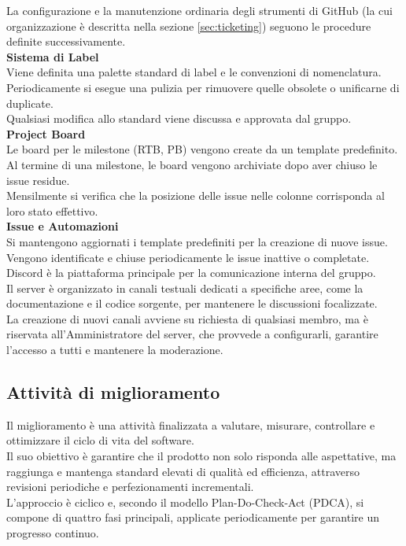 La configurazione e la manutenzione ordinaria degli strumenti di GitHub (la cui organizzazione è descritta nella sezione \ref{sec:ticketing}) seguono le procedure definite successivamente.\\[1em]
\textbf{Sistema di Label}\\
Viene definita una palette standard di label e le convenzioni di nomenclatura. Periodicamente si esegue una pulizia per rimuovere quelle obsolete o unificarne di duplicate.\\
Qualsiasi modifica allo standard viene discussa e approvata dal gruppo.\\[1em]
\textbf{Project Board}\\
Le board per le milestone (RTB, PB) vengono create da un template predefinito. Al termine di una milestone, le board vengono archiviate dopo aver chiuso le issue residue.\\
Mensilmente si verifica che la posizione delle issue nelle colonne corrisponda al loro stato effettivo.\\[1em]
\textbf{Issue e Automazioni}\\
Si mantengono aggiornati i template predefiniti per la creazione di nuove issue. Vengono identificate e chiuse periodicamente le issue inattive o completate. \\

Discord è la piattaforma principale per la comunicazione interna del gruppo.\\
Il server è organizzato in canali testuali dedicati a specifiche aree, come la documentazione e il codice sorgente, per mantenere le discussioni focalizzate.\\
La creazione di nuovi canali avviene su richiesta di qualsiasi membro, ma è riservata all'Amministratore del server, che provvede a configurarli, garantire l'accesso a tutti e mantenere la moderazione.

\subsection{Attività di miglioramento}
Il miglioramento è una attività finalizzata a valutare, misurare, controllare e ottimizzare il ciclo di vita del software.\\
Il suo obiettivo è garantire che il prodotto non solo risponda alle aspettative, ma raggiunga e mantenga standard elevati di qualità ed efficienza, attraverso revisioni periodiche e perfezionamenti incrementali.\\
L'approccio è ciclico e, secondo il modello Plan-Do-Check-Act (PDCA), si compone di quattro fasi principali, applicate periodicamente per garantire un progresso continuo.

